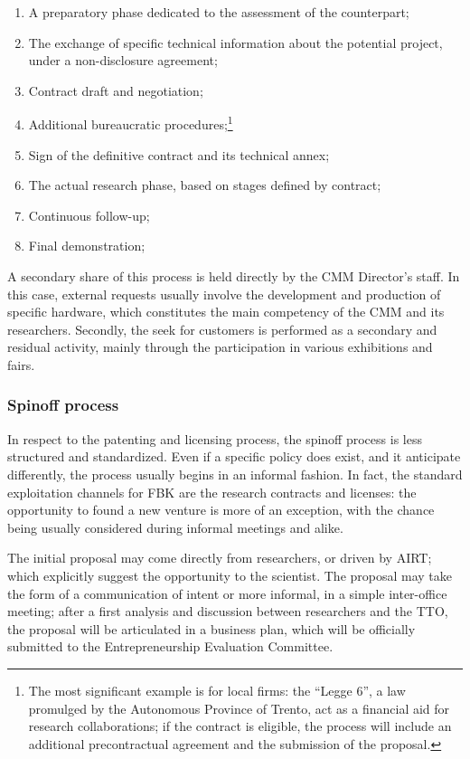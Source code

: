 \begin{enumerate}

\item A preparatory phase dedicated to the assessment of the counterpart;
\item The exchange of specific technical information about the potential project, under a non-disclosure agreement;
\item Contract draft and negotiation;
\item Additional bureaucratic procedures;\footnote{The most significant example is for local firms: the \enquote{Legge 6}, a law promulged by the Autonomous Province of Trento, act as a financial aid for research collaborations; if the contract is eligible, the process will include an additional precontractual agreement and the submission of the proposal.}
\item Sign of the definitive contract and its technical annex;
\item The actual research phase, based on stages defined by contract;
\item Continuous follow-up;
\item Final demonstration;

\end{enumerate}

A secondary share of this process is held directly by the CMM Director’s staff. In this case, external requests usually involve the development and production of specific hardware, which constitutes the main competency of the CMM and its researchers. Secondly, the seek for customers is performed as a secondary and residual activity, mainly through the participation in various exhibitions and fairs.

\subsubsection{Spinoff process}

In respect to the patenting and licensing process, the spinoff process is less structured and standardized. Even if a specific policy does exist, and it anticipate differently, the process usually begins in an informal fashion. In fact, the standard exploitation channels for FBK are the research contracts and licenses: the opportunity to found a new venture is more of an exception, with the chance being usually considered during informal meetings and alike.

The initial proposal may come directly from researchers, or driven by AIRT; which explicitly suggest the opportunity to the scientist. The proposal may take the form of a communication of intent or more informal, in a simple inter-office meeting; after a first analysis and discussion between researchers and the TTO, the proposal will be articulated in a business plan, which will be officially submitted to the Entrepreneurship Evaluation Committee. 

